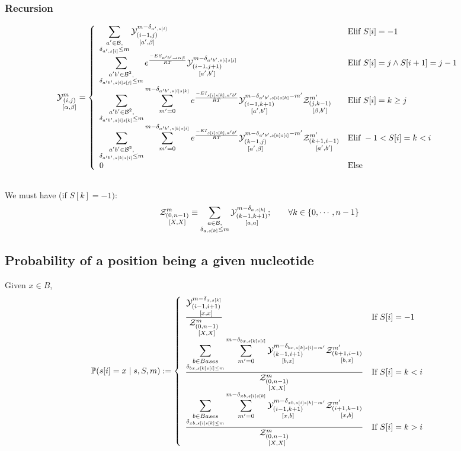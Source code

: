 \subsubsection{Recursion}
$$
	\Y{i,j}{m}{\alpha,\beta} = \left\{
  \begin{array}{ll}
		\displaystyle
    \sum_{\substack{a'\in \B,\\ \Kron_{a',s[i]}\le m}}
    \Y{i-1,j}{m- \Kron_{a',s[i]}}{a',\beta} &
    \text{Elif }S[i]=-1 \\
    \displaystyle
    \sum_{\substack{a'b'\in \B^2,\\ \Kron_{a'b',s[i]s[j]}\le m}}
		 e^{\frac{-ES_{ a' b' \to \alpha \beta }}{RT}}
    \Y{i-1,j+1}{m- \Kron_{a'b',s[i]s[j]}}{a',b'} &
   	 \text{Elif }S{[i]}=j \land S{[i+1]}=j-1\\
		 \displaystyle
		 \sum_{\substack{a'b'\in \B^2,\\ \Kron_{a'b',s[i]s[k]}\le m}}
		 \sum_{m'=0}^{m-\Kron_{a'b',s[i]s[k]}}
  		 e^{\frac{-EI_{s[i]s[k],a'b'}}{RT}}
		 \Y{i-1,k+1}{m- \Kron_{a'b',s[i]s[k]} - m'}{a',b'}
     \Z{j,k-1}{m'}{\beta,b'} &
		 \text{Elif }S{[i]}=k \geq j\\
		 \displaystyle
		 \sum_{\substack{a'b'\in \B^2,\\ \Kron_{a'b',s[k]s[i]}\le m}}
		 \sum_{m'=0}^{m-\Kron_{a'b',s[k]s[i]}}
  		 e^{\frac{-EI_{s[i]s[k],a'b'}}{RT}}
		 \Y{k-1,j}{m- \Kron_{a'b',s[k]s[i]} - m'}{a',\beta}
     \Z{k+1,i-1}{m'}{a',b'} &
		 \text{Elif }-1 < S{[i]}=k < i\\
		 0 & \text{Else}
  \end{array}\right.
$$
\subsection*{}
We must have (if $S[k] = -1)$:
$$
	\Z{0,n-1}{m}{X,X} \equiv     
	\sum_{\substack{a\in \B,\\ \Kron_{a,s[k]}\le m}}	
	\Y{k-1,k+1}{m-\Kron_{a,s[k]}}{a,a};\qquad
	\forall k \in \{0,\cdots,n-1\}
$$

\subsection{Probability of a position being a given nucleotide}
Given $x\in B$,
$$
	\mathbb{P}(s[i] = x\mid s, S,m):=\left\{
	\begin{array}{ll}
		\displaystyle
		\frac{
			\Y{i-1,i+1}{m-\Kron_{x,s[k]}}{x,x}
		}{
			\Z{0,n-1}{m}{X,X}
		}
		&\text{If }S[i] = -1\\
		\displaystyle
 		\frac{
			\displaystyle
			\sum_{\substack{b\in Bases\\\Kron_{bx,s[k]s[i]\leq m}}}
			\sum_{m'=0}^{m-\Kron_{bx,s[k]s[i]}}
			\Y{k-1,i+1}{m-\Kron_{bx,s[k]s[i]-m'}}{b,x}
			\Z{k+1,i-1}{m'}{b,x}
		}{
			\Z{0,n-1}{m}{X,X}
		}
		&\text{If }S[i]=k<i\\
		\displaystyle
		\frac{
			\displaystyle
			\sum_{\substack{b\in Bases\\\Kron_{xb,s[i]s[k]\leq m}}}
			\sum_{m'=0}^{m-\Kron_{xb,s[i]s[k]}}
			\Y{i-1,k+1}{m-\Kron_{xb,s[i]s[k]-m'}}{x,b}
			\Z{i+1,k-1}{m'}{x,b}
		}{
			\Z{0,n-1}{m}{X,X}
		}
		&\text{If }S[i]=k>i
	\end{array}\right.
$$
